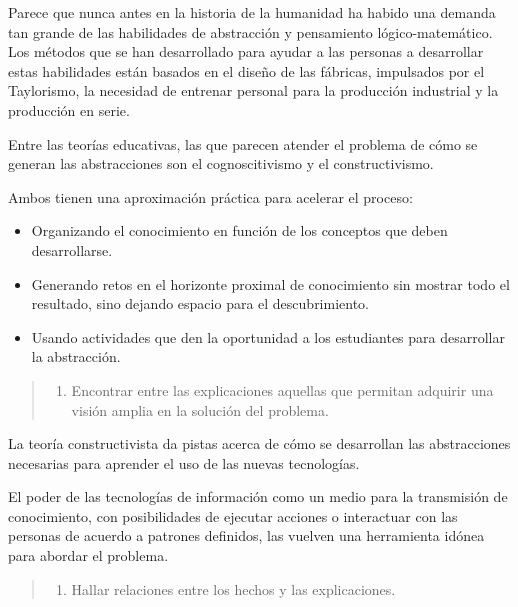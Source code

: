 \documentclass[
  12,
]{scrartcl}
\providecommand{\tightlist}{%
  \setlength{\itemsep}{0pt}\setlength{\parskip}{0pt}}
\begin{document}
Parece que nunca antes en la historia de la humanidad ha habido una
demanda tan grande de las habilidades de abstracción y pensamiento
lógico-matemático. Los métodos que se han desarrollado para ayudar a las
personas a desarrollar estas habilidades están basados en el diseño de
las fábricas, impulsados por el Taylorismo, la necesidad de entrenar
personal para la producción industrial y la producción en serie.

Entre las teorías educativas, las que parecen atender el problema de
cómo se generan las abstracciones son el cognoscitivismo y el
constructivismo.

Ambos tienen una aproximación práctica para acelerar el proceso:

\begin{itemize}
\tightlist
\item
  Organizando el conocimiento en función de los conceptos que deben
  desarrollarse.
\item
  Generando retos en el horizonte proximal de conocimiento sin mostrar
  todo el resultado, sino dejando espacio para el descubrimiento.
\item
  Usando actividades que den la oportunidad a los estudiantes para
  desarrollar la abstracción.
\end{itemize}

\begin{quote}
\begin{enumerate}
\def\labelenumi{\arabic{enumi}.}
\setcounter{enumi}{4}
\tightlist
\item
  Encontrar entre las explicaciones aquellas que permitan adquirir una
  visión amplia en la solución del problema.
\end{enumerate}
\end{quote}

La teoría constructivista da pistas acerca de cómo se desarrollan las
abstracciones necesarias para aprender el uso de las nuevas tecnologías.

El poder de las tecnologías de información como un medio para la
transmisión de conocimiento, con posibilidades de ejecutar acciones o
interactuar con las personas de acuerdo a patrones definidos, las
vuelven una herramienta idónea para abordar el problema.

\begin{quote}
\begin{enumerate}
\def\labelenumi{\arabic{enumi}.}
\setcounter{enumi}{5}
\tightlist
\item
  Hallar relaciones entre los hechos y las explicaciones.
\end{enumerate}
\end{quote}
\end{document}
